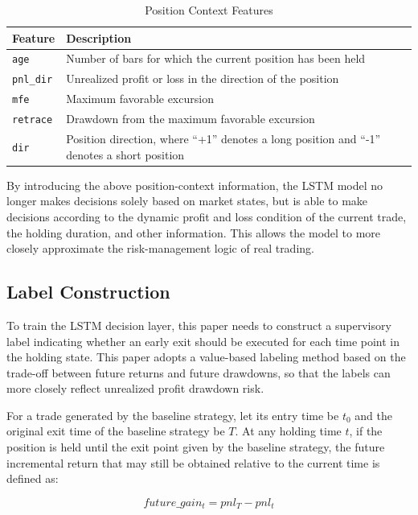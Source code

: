 \documentclass[12pt]{article}
\begin{document}
\begin{table}[htbp]
\centering
\caption{Position Context Features}
\label{tab:position_context_features}
\small
\renewcommand{\arraystretch}{1.2}
\begin{tabular}{p{}p{}}
\toprule
Feature & Description \\
\midrule
\texttt{age} & Number of bars for which the current position has been held \\
\texttt{pnl\_dir} & Unrealized profit or loss in the direction of the position \\
\texttt{mfe} & Maximum favorable excursion \\
\texttt{retrace} & Drawdown from the maximum favorable excursion \\
\texttt{dir} & Position direction, where ``+1'' denotes a long position and ``-1'' denotes a short position \\
\bottomrule
\end{tabular}
\end{table}

By introducing the above position-context information, the LSTM model no longer makes decisions 
solely based on market states, but is able to make decisions according to the dynamic profit 
and loss condition of the current trade, the holding duration, and other information. This 
allows the model to more closely approximate the risk-management logic of real trading.

\subsection{Label Construction}

To train the LSTM decision layer, this paper needs to construct a supervisory label indicating 
whether an early exit should be executed for each time point in the holding state. This paper 
adopts a value-based labeling method based on the trade-off between future returns and future 
drawdowns, so that the labels can more closely reflect unrealized profit drawdown risk.

For a trade generated by the baseline strategy, let its entry time be $t_0$ and the original 
exit time of the baseline strategy be $T$. At any holding time $t$, if the position is held 
until the exit point given by the baseline strategy, the future incremental return that may 
still be obtained relative to the current time is defined as:

\begin{equation}
    future\_gain_t = pnl_T - pnl_t
\end{equation}
\end{document}
